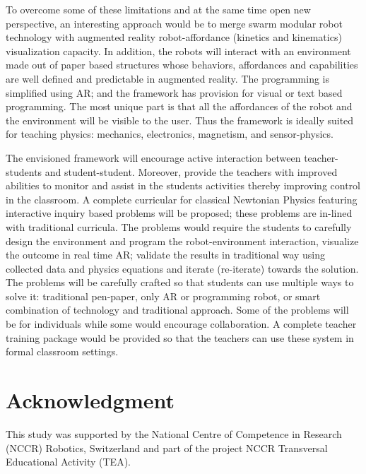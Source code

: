 \documentclass[conference]{IEEEtran}
\begin{document}
To overcome some of these limitations and at the same time open new perspective, an interesting approach would be to 
merge swarm modular robot technology with augmented reality robot-affordance (kinetics and kinematics) visualization 
capacity. In addition, the robots will interact with an environment made out of paper based structures whose behaviors, 
affordances and capabilities are well defined and predictable in augmented reality. The programming is simplified using 
AR; and the framework has provision for visual or text based programming. The most unique part is that all the 
affordances of the robot and the environment will be visible to the user. Thus the framework is ideally suited for 
teaching physics: mechanics, electronics, magnetism, and sensor-physics. 

The envisioned framework will encourage active interaction between teacher-students and student-student. Moreover, 
provide the teachers with improved abilities to monitor and assist in the students activities thereby improving control 
in the classroom. A complete curricular for classical Newtonian Physics featuring interactive inquiry based problems 
will be proposed; these problems are in-lined with traditional curricula. The problems would require the students to 
carefully design the environment and program the robot-environment interaction, visualize the outcome in real time 
AR; validate the results in traditional way using collected data and physics equations and iterate 
(re-iterate) towards the solution. The problems will be carefully crafted so that students can use multiple ways to 
solve it: traditional pen-paper, only AR or programming robot, or smart combination of technology and traditional 
approach. Some of the problems will be for individuals while some would encourage collaboration. A complete 
teacher training package would be provided so that the teachers can use these system in formal classroom settings.
\section*{Acknowledgment}
This study was supported by the National Centre of Competence in Research (NCCR) Robotics, Switzerland and part of the 
project NCCR Transversal Educational Activity (TEA).


\end{document}
